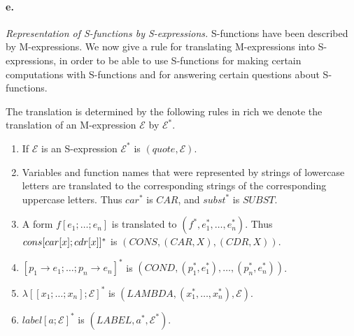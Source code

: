 \documentclass[11pt, a4paper]{article}
\begin{document}
\paragraph{e.}\textit{Representation of S-functions by S-expressions.}
S-functions have been described by M-expressions. We now give a rule for
translating M-expressions into S-expressions, in order to be able to use
S-functions for making certain computations with S-functions and for answering
certain questions about S-functions.

The translation is determined by the following rules in rich we denote the
translation of an M-expression $\mathcal{E}$ by $\mathcal{E}^*$.
\begin{enumerate}
\item If $\mathcal{E}$ is an S-expression $\mathcal{E}^*$ is $(quote, \mathcal{E})$.
\item Variables and function names that were represented by strings of lowercase
  letters are translated to the corresponding strings of the corresponding
  uppercase letters. Thus $car^*$ is $CAR$, and $subst^*$ is $SUBST$.
\item A form $f[e_1; \ldots; e_n]$ is translated to $(f^*, e_1^*, \ldots,
  e_n^*)$. Thus $cons[car[x];\\cdr[x]]^*$ is $(CONS, (CAR, X), (CDR, X))$.
\item ${[p_1 \to e_1; \ldots; p_n \to e_n]}^*$ is $(COND, (p_1^*, e_1^*),
  \ldots, (p_n^*, e_n^*))$.
\item ${\lambda[[x_1; \ldots; x_n]; \mathcal{E}]}^*$ is $(LAMBDA, (x_1^*, \ldots,
  x_n^*), \mathcal{E})$.
\item ${label[a; \mathcal{E}]}^*$ is $(LABEL, a^*, \mathcal{E}^*)$.
\end{enumerate}
\end{document}
